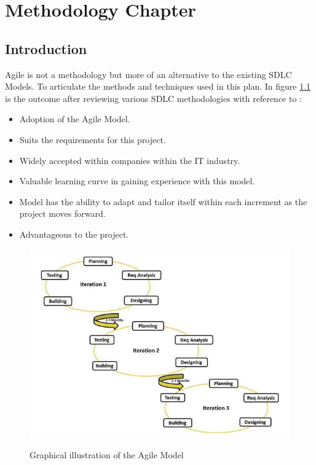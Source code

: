 \chapter{Methodology Chapter}


\section{Introduction}

Agile is not a methodology but more of an alternative to the existing SDLC Models. To articulate the methods and techniques used in this plan. In figure \ref{fig:agile} is the outcome after reviewing various SDLC methodologies with reference to \cite{TP-16}:
\begin{itemize}
	\item Adoption of the Agile Model.
	\item Suits the requirements for this project.
	\item Widely accepted within companies within the IT industry.
	\item Valuable learning curve in gaining experience with this model.
	\item Model has the ability to adapt and tailor itself within each increment as the project moves forward.
	\item Advantageous to the project.
\end{itemize}

\begin{figure}[Htbp]
\center \includegraphics[width=400pt]{Figures/sdlc_agile_model}\\
\caption{Graphical illustration of the Agile Model \citep{TP-16}} \label{Figure: Graphical illustration of the Agile Model}
\label{fig:agile}
\end{figure}	

